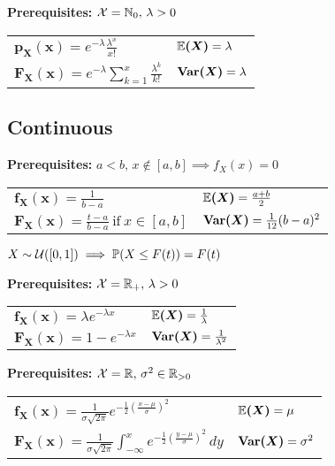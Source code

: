 \begin{ddefinition*}
  \textbf{Prerequisites:} \(\operatorname{\mathcal{X}} = \mathbb{N}_0, \, \lambda > 0\) \\
  \begin{tabularx}{\linewidth}{@{}ll@{}}
    \(\bm{p_X(x)} = e^{-\lambda}\frac{\lambda^x}{x!}\) & \(\bm{\mathbb{E}(X)} = \lambda\) \\
    \(\bm{F_X(x)} = e^{-\lambda} \sum\limits_{k=1}^x \frac{\lambda^k}{k!}\) & \(\bm{\Var(X)} = \lambda\)
  \end{tabularx}
\end{ddefinition*}

\pagebreak
\subsection*{Continuous}
\begin{cdefinition*}
  \textbf{Prerequisites:} \(a < b, \, x \notin [a, b] \implies f_X(x) = 0\) \\
  \begin{tabularx}{\linewidth}{@{}ll@{}}
    \(\bm{f_X(x)} = \frac{1}{b-a}\) & \(\bm{\mathbb{E}(X)} = \frac{a + b}{2}\) \\
    \(\bm{F_X(x)} = \frac{t - a}{b - a} \ \text{if} \ x \in [a, b]\) & \(\bm{\Var(X)} = \frac{1}{12}(b - a)^2\)
  \end{tabularx}
\end{cdefinition*}

\begin{lemma}
  \(X \sim \operatorname{\mathcal{U}}([0, 1]) \implies \mathbb{P}(X \leq F(t)) = F(t)\)
\end{lemma}

\begin{cdefinition*}
  \textbf{Prerequisites:} \(\operatorname{\mathcal{X}} = \mathbb{R}_+, \, \lambda > 0\) \\
  \begin{tabularx}{\linewidth}{@{}ll@{}}
    \(\bm{f_X(x)} = \lambda e^{-\lambda x}\) & \(\bm{\mathbb{E}(X)} = \frac{1}{\lambda}\) \\
    \(\bm{F_X(x)} = 1 - e^{-\lambda x}\) & \(\bm{\Var(X)} = \frac{1}{\lambda^2}\)
  \end{tabularx}
\end{cdefinition*}

\begin{cdefinition*}
  \textbf{Prerequisites:} \(\operatorname{\mathcal{X}} = \mathbb{R}, \, \sigma^2 \in \mathbb{R}_{>0}\) \\
  \begin{tabularx}{\linewidth}{@{}ll@{}}
    \(\bm{f_X(x)} = \frac{1}{\sigma\sqrt{2 \pi}}e^{-\frac{1}{2}\left(\frac{x - \mu}{\sigma}\right)^2}\) & \(\bm{\mathbb{E}(X)} = \mu\) \\
    \(\bm{F_X(x)} = \frac{1}{\sigma\sqrt{2 \pi}}\int_{-\infty}^xe^{-\frac{1}{2}\left(\frac{y - \mu}{\sigma}\right)^2} \, dy\) & \(\bm{\Var(X)} = \sigma^2\)
  \end{tabularx}
\end{cdefinition*}

